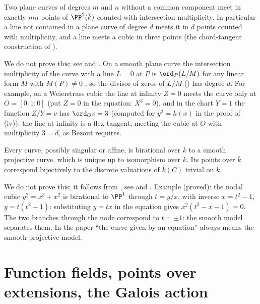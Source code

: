 \begin{theorem}\label{thm:curves:bezout}
Two plane curves of degrees $m$ and $n$ without a common component meet in exactly $mn$ points of $\PP^2(\bar k)$ counted with intersection multiplicity.
In particular a line not contained in a plane curve of degree $d$ meets it in $d$ points counted with multiplicity, and a line meets a cubic in three
points (the chord-tangent construction of ).
\end{theorem}

We do not prove this; see \cite[Chapter 5, Section 3]{Fulton} and \cite[Chapter I, Section 7]{Hartshorne}. On a smooth plane curve the
intersection multiplicity of the curve with a line $L=0$ at $P$ is $\ord_P(L/M)$ for any linear form $M$ with $M(P)\ne0$ \cite[Chapter 3]{Fulton}, so
the divisor of zeros of $L/M$ () has degree $d$. For example, on a Weierstrass cubic the line at infinity $Z=0$ meets the curve
only at $O=[0:1:0]$ (put $Z=0$ in the equation: $X^3=0$), and in the chart $Y=1$ the function $Z/Y=v$ has $\ord_Ov=3$ (computed for $y^2=h(x)$ in the proof of
(iv)): the line at infinity is a flex tangent, meeting the cubic at $O$ with multiplicity $3=d$, as Bezout requires.

\begin{theorem}\label{thm:curves:smooth-model}
Every curve, possibly singular or affine, is birational over $k$ to a smooth projective curve, which is unique up to isomorphism over $k$. Its
points over $\bar k$ correspond bijectively to the discrete valuations of $\bar k(C)$ trivial on $\bar k$.
\end{theorem}

We do not prove this; it follows from , see \cite[Chapter I, Section 6]{Hartshorne} and \cite[Chapter 7]{Fulton}.
Example (proved): the nodal cubic $y^2=x^3+x^2$ is birational to $\PP^1$ through $t=y/x$, with inverse $x=t^2-1$, $y=t(t^2-1)$: substituting $y=tx$
in the equation gives $x^2(t^2-x-1)=0$. The two branches through the node correspond to $t=\pm1$: the smooth model separates them. In the paper
``the curve given by an equation'' always means the smooth projective model.

\section{Function fields, points over extensions, the Galois action}\label{sec:curves:function-fields}

